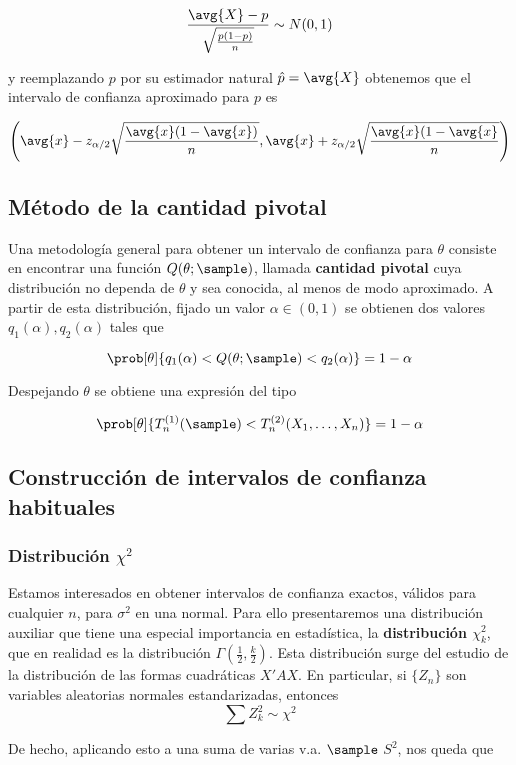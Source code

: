 \documentclass{apuntes}
\begin{document}
\[ \frac{\avg{X}-p}{\sqrt{\frac{p(1-p)}{n}}} \sim N(0,1) \]

y reemplazando $p$ por su estimador natural $\hat{p} = \avg{X}$ obtenemos que el intervalo de confianza aproximado para $p$ es

\[ \left( \avg{x} - z_{\alpha/2} \sqrt{\frac{\avg{x}(1-\avg{x})}{n}}, \avg{x} + z_{\alpha/2} \sqrt{\frac{\avg{x}(1-\avg{x}}{n}} \right) \]

\subsection{Método de la cantidad pivotal}
Una metodología general para obtener un intervalo de confianza para $\theta$ consiste en encontrar una función $Q(\theta;\sample)$, llamada \textbf{cantidad pivotal} cuya distribución no dependa de $\theta$ y sea conocida, al menos de modo aproximado. A partir de esta distribución, fijado un valor $\alpha\in(0,1)$ se obtienen dos valores $q_1(\alpha), q_2(\alpha)$ tales que

\[ \prob[\theta]{q_1(\alpha) < Q(\theta;\sample) < q_2(\alpha)} = 1-\alpha \]

Despejando $\theta$ se obtiene una expresión del tipo

\[ \prob[\theta]{T_n^{(1)}(\sample) < T_n^{(2)}(X_1,\dotsc,X_n)} = 1- \alpha \]

\subsection{Construcción de intervalos de confianza habituales}

\subsubsection{Distribución $\chi^2$}
\label{ChiSquared}
Estamos interesados en obtener intervalos de confianza exactos, válidos para cualquier $n$, para $\sigma^2$ en una normal. Para ello presentaremos una distribución auxiliar que tiene una especial importancia en estadística, la \textbf{distribución $\chi_k^2$}, que en realidad es la distribución $Γ(\frac{1}{2}, \frac{k}{2})$.
Esta distribución surge del estudio de la distribución de las formas cuadráticas $X'AX$. En particular, si $\{Z_n\}$ son variables aleatorias normales estandarizadas, entonces
\[ \sum Z_k^2 \sim \chi^2 \]

De hecho, aplicando esto a una suma de varias v.a. $\sample$ $S^2$, nos queda que
\end{document}
